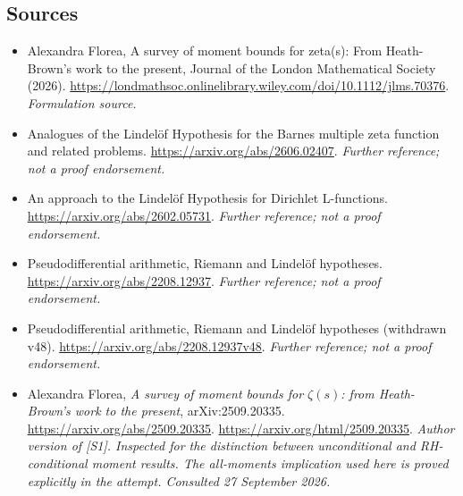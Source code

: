 \documentclass[11pt]{article}
\begin{document}
\subsection{Sources}
\begin{itemize}
\item[S1]Alexandra Florea, A survey of moment bounds for zeta(s): From Heath-Brown's work to the present, Journal of the London Mathematical Society (2026).
\url{https://londmathsoc.onlinelibrary.wiley.com/doi/10.1112/jlms.70376}.
\textit{Formulation source.}
\item[S2]Analogues of the Lindelöf Hypothesis for the Barnes multiple zeta function and related problems.
\url{https://arxiv.org/abs/2606.02407}.
\textit{Further reference; not a proof endorsement.}
\item[S3]An approach to the Lindelöf Hypothesis for Dirichlet L-functions.
\url{https://arxiv.org/abs/2602.05731}.
\textit{Further reference; not a proof endorsement.}
\item[S4]Pseudodifferential arithmetic, Riemann and Lindelöf hypotheses.
\url{https://arxiv.org/abs/2208.12937}.
\textit{Further reference; not a proof endorsement.}
\item[S5]Pseudodifferential arithmetic, Riemann and Lindelöf hypotheses (withdrawn v48).
\url{https://arxiv.org/abs/2208.12937v48}.
\textit{Further reference; not a proof endorsement.}

\item[E1]Alexandra Florea, \emph{A survey of moment bounds for
$\zeta(s)$: from Heath-Brown's work to the present}, arXiv:2509.20335.
\url{https://arxiv.org/abs/2509.20335}.
\url{https://arxiv.org/html/2509.20335}.
\textit{Author version of [S1]. Inspected for the distinction between
unconditional and RH-conditional moment results. The all-moments implication
used here is proved explicitly in the attempt. Consulted 27 September 2026.}
\end{itemize}
\end{document}

